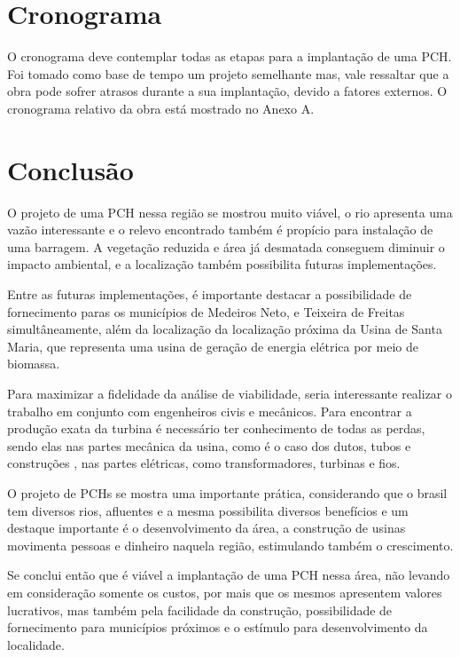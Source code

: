 \chapter{Cronograma}
O cronograma deve contemplar todas as etapas para a implantação de uma PCH. Foi tomado como base de tempo um projeto semelhante mas, vale ressaltar que a obra pode sofrer atrasos durante a sua implantação, devido a fatores externos. O cronograma relativo da obra está mostrado no Anexo A.

\chapter{Conclusão}
O projeto de uma PCH nessa região se mostrou muito viável, o rio apresenta uma vazão interessante e o relevo encontrado também é propício para instalação de uma barragem. A vegetação reduzida e área já desmatada conseguem diminuir o impacto ambiental, e a localização também possibilita futuras implementações.

Entre as futuras implementações, é importante destacar a possibilidade de fornecimento paras os municípios de Medeiros Neto, e Teixeira de Freitas simultâneamente, além da localização da localização próxima da Usina de Santa Maria, que representa uma usina de geração de energia elétrica por meio de biomassa.

Para maximizar a fidelidade da análise de viabilidade, seria interessante realizar o trabalho em conjunto com engenheiros civis e mecânicos. Para encontrar a produção exata da turbina é necessário ter conhecimento de todas as perdas, sendo elas nas partes mecânica da usina, como é o caso dos dutos, tubos e construções , nas partes elétricas, como transformadores, turbinas e fios.

O projeto de PCHs se mostra uma importante prática, considerando que o brasil tem diversos rios, afluentes e a mesma possibilita diversos benefícios e um destaque importante é o desenvolvimento da área, a construção de usinas movimenta pessoas e dinheiro naquela região, estimulando também o crescimento.

Se conclui então que é viável a implantação de uma PCH nessa área, não levando em consideração somente os custos, por mais que os mesmos apresentem valores lucrativos, mas também pela facilidade da construção, possibilidade de fornecimento para municípios próximos e o estímulo para desenvolvimento da localidade.
